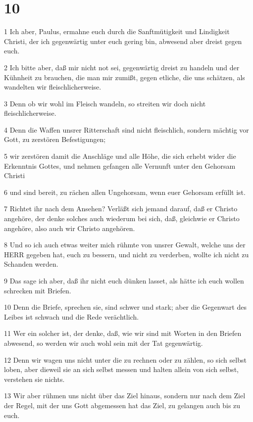 \chapter{10}

\par 1 Ich aber, Paulus, ermahne euch durch die Sanftmütigkeit und Lindigkeit Christi, der ich gegenwärtig unter euch gering bin, abwesend aber dreist gegen euch.
\par 2 Ich bitte aber, daß mir nicht not sei, gegenwärtig dreist zu handeln und der Kühnheit zu brauchen, die man mir zumißt, gegen etliche, die uns schätzen, als wandelten wir fleischlicherweise.
\par 3 Denn ob wir wohl im Fleisch wandeln, so streiten wir doch nicht fleischlicherweise.
\par 4 Denn die Waffen unsrer Ritterschaft sind nicht fleischlich, sondern mächtig vor Gott, zu zerstören Befestigungen;
\par 5 wir zerstören damit die Anschläge und alle Höhe, die sich erhebt wider die Erkenntnis Gottes, und nehmen gefangen alle Vernunft unter den Gehorsam Christi
\par 6 und sind bereit, zu rächen allen Ungehorsam, wenn euer Gehorsam erfüllt ist.
\par 7 Richtet ihr nach dem Ansehen? Verläßt sich jemand darauf, daß er Christo angehöre, der denke solches auch wiederum bei sich, daß, gleichwie er Christo angehöre, also auch wir Christo angehören.
\par 8 Und so ich auch etwas weiter mich rühmte von unsrer Gewalt, welche uns der HERR gegeben hat, euch zu bessern, und nicht zu verderben, wollte ich nicht zu Schanden werden.
\par 9 Das sage ich aber, daß ihr nicht euch dünken lasset, als hätte ich euch wollen schrecken mit Briefen.
\par 10 Denn die Briefe, sprechen sie, sind schwer und stark; aber die Gegenwart des Leibes ist schwach und die Rede verächtlich.
\par 11 Wer ein solcher ist, der denke, daß, wie wir sind mit Worten in den Briefen abwesend, so werden wir auch wohl sein mit der Tat gegenwärtig.
\par 12 Denn wir wagen uns nicht unter die zu rechnen oder zu zählen, so sich selbst loben, aber dieweil sie an sich selbst messen und halten allein von sich selbst, verstehen sie nichts.
\par 13 Wir aber rühmen uns nicht über das Ziel hinaus, sondern nur nach dem Ziel der Regel, mit der uns Gott abgemessen hat das Ziel, zu gelangen auch bis zu euch.
